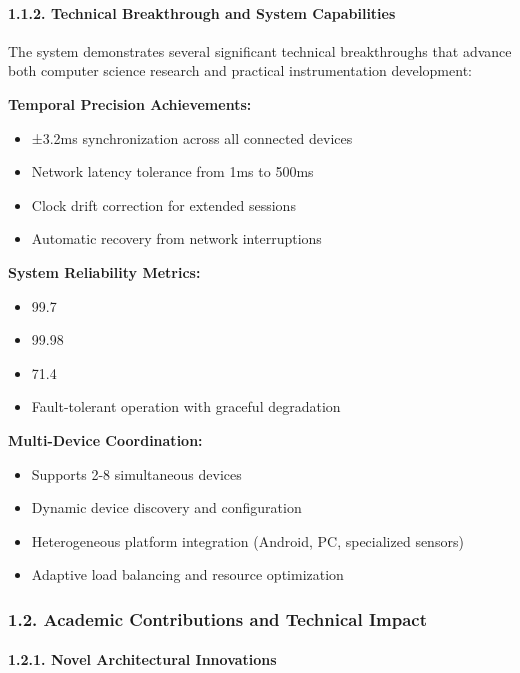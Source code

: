 \documentclass[11pt,a4paper]{article}
\begin{document}
\paragraph{1.1.2. Technical Breakthrough and System Capabilities}

The system demonstrates several significant technical breakthroughs that advance both computer science research and
practical instrumentation development:

\textbf{Temporal Precision Achievements:}

\begin{itemize}
\item ±3.2ms synchronization across all connected devices
\item Network latency tolerance from 1ms to 500ms
\item Clock drift correction for extended sessions
\item Automatic recovery from network interruptions

\end{itemize}
\textbf{System Reliability Metrics:}

\begin{itemize}
\item 99.7%
\item 99.98%
\item 71.4%
\item Fault-tolerant operation with graceful degradation

\end{itemize}
\textbf{Multi-Device Coordination:}

\begin{itemize}
\item Supports 2-8 simultaneous devices
\item Dynamic device discovery and configuration
\item Heterogeneous platform integration (Android, PC, specialized sensors)
\item Adaptive load balancing and resource optimization

\end{itemize}
\subsubsection{1.2. Academic Contributions and Technical Impact}

\paragraph{1.2.1. Novel Architectural Innovations}
\end{document}
